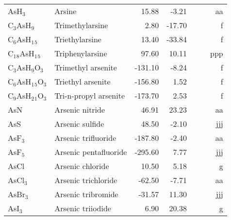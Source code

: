 \begin{table}
\begin{center}
\begin{tabular}{llrrrrr}
 AsH$_3$        & Arsine                                 &    15.88    &    -3.21  &  &  &     aa\\
 C$_3$AsH$_9$      & Trimethylarsine                        &     2.80    &   -17.70  &  &  &      f\\
 C$_6$AsH$_1$$_5$     & Triethylarsine                         &    13.40    &   -33.84  &  &  &      f\\
 C$_1$$_8$AsH$_1$$_5$    & Triphenylarsine                        &    97.60    &    10.11  &  &  &    ppp\\
 C$_3$AsH$_9$O$_3$    & Trimethyl arsenite                     &  -131.10    &    -8.24  &  &  &      f\\
 C$_6$AsH$_1$$_5$O$_3$   & Triethyl arsenite                      &  -156.80    &     1.52  &  &  &      f\\
 C$_9$AsH$_2$$_1$O$_3$   & Tri-n-propyl arsenite                  &  -173.70    &     2.53  &  &  &      f\\
 AsN         & Arsenic nitride                        &    46.91    &    23.23  &  &  &     aa\\
 AsS         & Arsenic sulfide                        &    48.50    &    -2.10  &  &  &    jjj\\
 AsF$_3$        & Arsenic trifluoride                    &  -187.80    &    -2.40  &  &  &     aa\\
 AsF$_5$        & Arsenic pentafluoride                  &  -295.60    &     7.77  &  &  &    jjj\\
 AsCl        & Arsenic chloride                       &    10.50    &     5.18  &  &  &      g\\
 AsCl$_3$       & Arsenic trichloride                    &   -62.50    &    -7.71  &  &  &     aa\\
 AsBr$_3$       & Arsenic tribromide                     &   -31.57    &    11.30  &  &  &    jjj\\
 AsI$_3$        & Arsenic triiodide                      &     6.90    &    20.38  &  &  &      g\\
\hline
\end{tabular}
\end{center}
\end{table}
\clearpage

